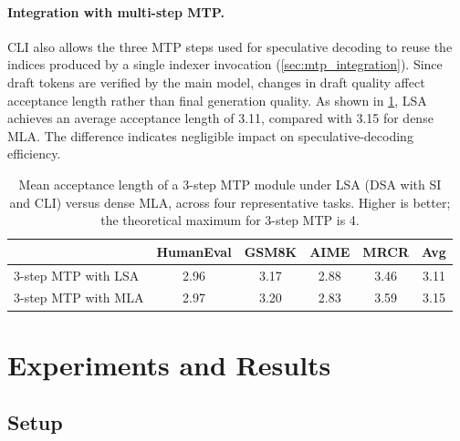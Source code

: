 \documentclass{article}
\begin{document}
\paragraph{Integration with multi-step MTP.}
CLI also allows the three MTP steps used for speculative decoding to reuse the indices produced by a single indexer invocation (\cref{sec:mtp_integration}). Since draft tokens are verified by the main model, changes in draft quality affect acceptance length rather than final generation quality. As shown in \cref{tab:mtp_accept}, LSA achieves an average acceptance length of 3.11, compared with 3.15 for dense MLA. The difference indicates negligible impact on speculative-decoding efficiency.

\begin{table}[t]
\centering
\caption{Mean acceptance length of a 3-step MTP module under LSA (DSA with SI and CLI) versus dense MLA, across four representative tasks. Higher is better; the theoretical maximum for 3-step MTP is 4.}
\label{tab:mtp_accept}
\small
\begin{tabular}{l|cccc|c}
\toprule
& HumanEval & GSM8K & AIME & MRCR & \textbf{Avg} \\
\midrule
3-step MTP with LSA & 2.96 & 3.17 & 2.88 & 3.46 & 3.11 \\
3-step MTP with MLA  & 2.97 & 3.20 & 2.83 & 3.59 & 3.15 \\
\bottomrule
\end{tabular}
\end{table}

\section{Experiments and Results}
\label{sec:exp}

\subsection{Setup}
\label{sec:exp_setup}
\end{document}
